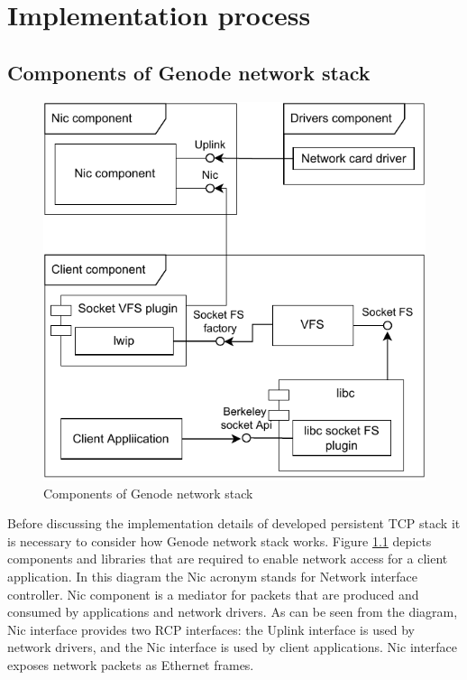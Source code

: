 \chapter{Implementation process}
\label{chap:impl}

\section{Components of Genode network stack}

\begin{figure}
    \centering
    \includegraphics[]{figs/genode-network-stack.pdf}
    \caption{Components of Genode network stack}
    \label{fig:net-components}
\end{figure}

Before discussing the implementation details of developed persistent TCP stack
it is necessary to consider how Genode network stack works. Figure
\ref{fig:net-components} depicts components and libraries that are required to
enable network access for a client application. In this diagram the Nic acronym
stands for Network interface controller. Nic component is a mediator for
packets that are produced and consumed by applications and network drivers.  As
can be seen from the diagram, Nic interface provides two RCP interfaces: the
Uplink interface is used by network drivers, and the Nic interface is used by
client applications. Nic interface exposes network packets as Ethernet frames.

